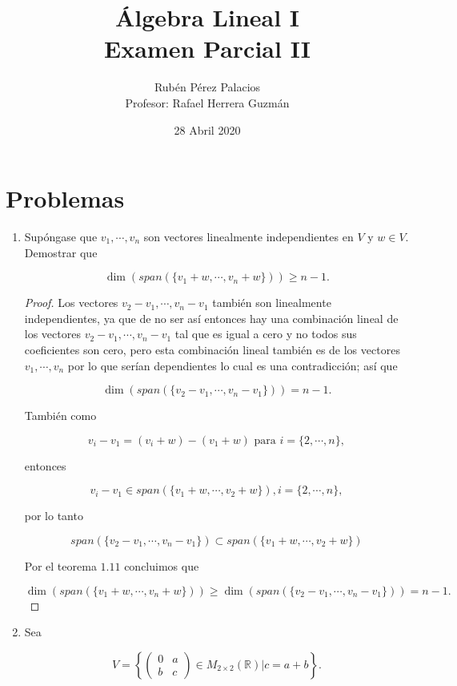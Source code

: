 \documentclass[letterpaper]{article}
\title{Álgebra Lineal I\\Examen Parcial II}
\author{Rubén Pérez Palacios\\Profesor: Rafael Herrera Guzmán}
\date{28 Abril 2020}
\theoremstyle{definition}
\theoremstyle{lemathm}
\theoremstyle{lemademthm}
\newcommand{\R}{\mathbb{R}}
\begin{document}
	\maketitle
    
    \section*{Problemas}

    \begin{enumerate}
        
        \item Supóngase que $v_1, \cdots , v_n$ son vectores linealmente independientes en $V$ y $w \in V$. Demostrar que
		
		\[\dim(span(\{v_1+w,\cdots,v_n+w\})) \geq n-1.\]

		\begin{proof}
			Los vectores $v_2 - v_1, \cdots, v_n - v_1$ también son linealmente independientes, ya que de no ser así entonces hay una combinación lineal de los vectores $v_2 - v_1, \cdots, v_n - v_1$ tal que es igual a cero y no todos sus coeficientes son cero, pero esta combinación lineal también es de los vectores $v_1,\cdots,v_n$ por lo que serían dependientes lo cual es una contradicción; así que 
			
			\[\dim(span(\{v_2-v_1,\cdots,v_n-v_1\})) = n-1.\]
			
			También como
			
			\[v_i - v_1 = (v_i + w) - (v_1 + w) \text{ para } i = \{2,\cdots,n\},\]
			
			entonces
			
			\[v_i - v_1 \in span(\{v_1+w,\cdots,v_2+w\}), i = \{2,\cdots,n\},\]

			por lo tanto

			\[span(\{v_2-v_1,\cdots,v_n-v_1\}) \subset span(\{v_1+w,\cdots,v_2+w\})\]

			Por el teorema $1.11$ concluimos que

			\[\dim(span(\{v_1+w,\cdots,v_n+w\})) \geq \dim(span(\{v_2-v_1,\cdots,v_n-v_1\})) = n - 1.\]
			
		\end{proof}

		\newpage

		\item Sea
		
		\[V = \left\{\begin{pmatrix}
			0 & a\\
			b & c
		\end{pmatrix} \in M_{2\times2}(\R) | c = a + b \right\}.\]


\end{enumerate}
\end{document}
